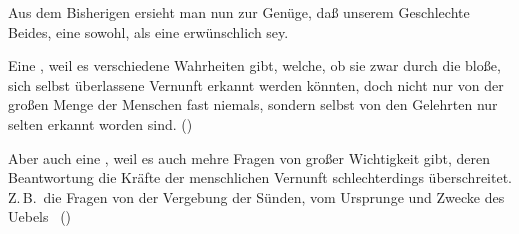Aus dem Bisherigen ersieht man nun zur Genüge, daß unserem Geschlechte Beides, eine  sowohl, als eine  erwünschlich sey.
\begin{aufzb}
\item Eine , weil es verschiedene Wahrheiten gibt, welche, ob sie zwar durch die bloße, sich selbst überlassene Vernunft erkannt werden könnten, doch nicht nur von der großen Menge der Menschen fast niemals, sondern selbst von den Gelehrten nur selten erkannt worden sind. ()
\item Aber auch eine , weil es auch mehre Fragen von großer Wichtigkeit gibt, deren Beantwortung die Kräfte der menschlichen Vernunft schlechterdings überschreitet. Z.\,B.\ die Fragen von der Vergebung der Sünden, vom Ursprunge und Zwecke des Uebels \uma\  ()
\end{aufzb}

